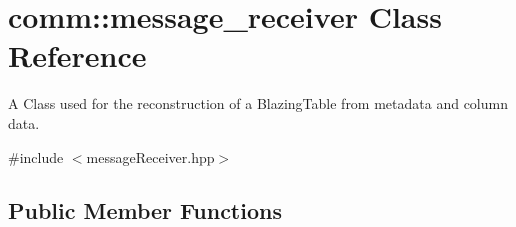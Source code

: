 \hypertarget{classcomm_1_1message__receiver}{}\section{comm\+:\+:message\+\_\+receiver Class Reference}
\label{classcomm_1_1message__receiver}


A Class used for the reconstruction of a Blazing\+Table from metadata and column data.  




{\ttfamily \#include $<$message\+Receiver.\+hpp$>$}

\subsection*{Public Member Functions}
